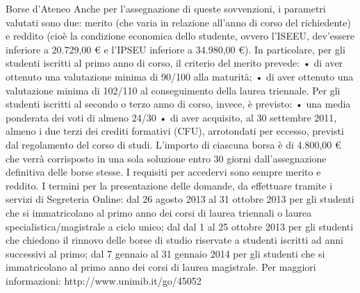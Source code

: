 Borse d'Ateneo
Anche per l'assegnazione di queste sovvenzioni, i parametri valutati sono due: merito (che varia in relazione all'anno di corso del richiedente) e reddito (cioè la condizione economica dello studente, ovvero l'ISEEU, dev'essere inferiore a 20.729,00 € e l'IPSEU inferiore a 34.980,00 €). 
In particolare, per gli studenti iscritti al primo anno di corso, il criterio del merito prevede: 
      • di aver ottenuto una valutazione minima di 90/100 alla maturità; 
      • di aver ottenuto una valutazione minima di 102/110 al conseguimento della laurea triennale. 
Per gli studenti iscritti al secondo o terzo anno di corso, invece, è previsto: 
      • una media ponderata dei voti di almeno 24/30 
      • di  aver acquisito, al 30 settembre 2011, almeno i  due terzi dei crediti formativi (CFU), arrotondati per eccesso, previsti dal regolamento del corso di studi. 
L'importo di ciascuna borsa è di 4.800,00 € che verrà corrisposto in una sola soluzione entro 30 giorni dall'assegnazione definitiva delle borse stesse. I requisiti per accedervi sono sempre merito e reddito.
I termini per la  presentazione delle domande, da effettuare tramite i servizi di Segreteria Online: dal 26 agosto 2013 al 31 ottobre 2013 per gli studenti che si immatricolano al primo anno dei corsi di laurea triennali o laurea specialistica/magistrale a ciclo unico; dal dal 1 al 25 ottobre 2013 per gli studenti che chiedono il rinnovo delle borse di studio riservate a studenti iscritti ad anni successivi al primo; dal 7 gennaio al 31 gennaio 2014 per gli studenti che si immatricolano al primo anno dei corsi di laurea magistrale. 
Per maggiori informazioni: http://www.unimib.it/go/45052
